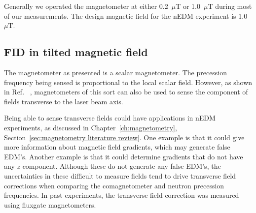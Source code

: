Generally we operated the magnetometer at either 0.2~$\mu$T or
1.0~$\mu$T during most of our measurements.  The design magnetic field
for the nEDM experiment is 1.0~$\mu$T.









\subsection{FID in tilted magnetic field\label{sec:ch4_tilted_field}}

The magnetometer as presented is a scalar magnetometer.  The
precession frequency being sensed is proportional to the local scalar
field.  However, as shown in Ref.~\cite{PhysRevA.74.063420} , magnetometers
of this sort can also be used to sense the component of fields
transverse to the laser beam axis.


Being able to sense transverse fields could have applications in nEDM
experiments, as discussed in Chapter~\ref{ch:magnetometry},
Section~\ref{sec:magnetometry literature review}.  One example is that it could give
more information about magnetic field gradients, which may generate
false EDM's.  Another example is that it could determine gradients
that do not have any $z$-component.  Although these do not generate
any false EDM's, the uncertainties in these difficult to measure
fields tend to drive transverse field corrections when comparing the
comagnetometer and neutron precession frequencies.  In past
experiments, the transverse field correction was measured using
fluxgate magnetometers.

